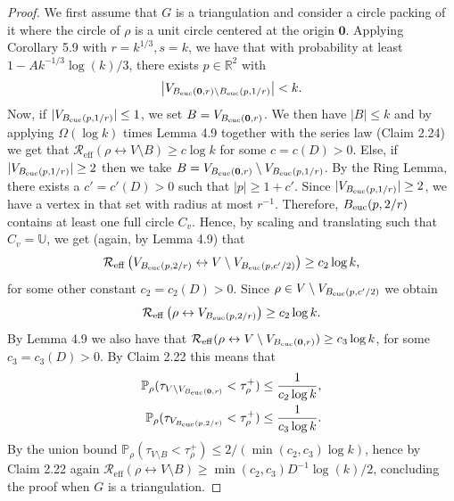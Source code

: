 \documentclass[UTF8,11pt]{ctexart}
\theoremstyle{definition}
\newcommand{\R}{\mathbb R}
\newcommand{\Prob}{\mathbb P}
\newcommand{\Reff}{\mathcal R_{\mathrm{eff}}}
\begin{document}
\begin{proof}
We first assume that $G$ is a triangulation and consider a circle packing of it where the circle of $\rho$ is a unit circle centered at the origin $\mathbf0$. Applying Corollary 5.9 with $r=k^{1/3},s=k$, we have that with probability at least $1-Ak^{-1/3}\log(k)/3$, there exists $p\in\R^2$ with
\[
\left|V_{B_{\rm euc}(\mathbf0,r)\setminus B_{\rm euc}(p,1/r)}\right|<k.
\]
Now, if $|V_{B_{\rm euc}(p,1/r)}|\le1$, we set $B=V_{B_{\rm euc}(\mathbf0,r)}$. We then have $|B|\le k$ and by applying $\Omega(\log k)$ times Lemma 4.9 together with the series law (Claim 2.24) we get that $\Reff(\rho\leftrightarrow V\setminus B)\ge c\log k$ for some $c=c(D)>0$.
Else, if $|V_{B_{\rm euc}(p,1/r)}|\ge2$ then we take $B=V_{B_{\rm euc}(\mathbf0,r)}\setminus V_{B_{\rm euc}(p,1/r)}$. By the Ring Lemma, there exists a $c'=c'(D)>0$ such that $|p|\ge1+c'$. Since $|V_{B_{\rm euc}(p,1/r)}|\ge2$, we have a vertex in that set with radius at most $r^{-1}$. Therefore, $B_{\rm euc}(p,2/r)$ contains at least one full circle $C_v$. Hence, by scaling and translating such that $C_v=\mathbb U$, we get (again, by Lemma 4.9) that
\[
\Reff\left(V_{B_{\rm euc}(p,2/r)}\leftrightarrow V\setminus V_{B_{\rm euc}(p,c'/2)}\right)\ge c_2\log k,
\]
for some other constant $c_2=c_2(D)>0$. Since $\rho\in V\setminus V_{B_{\rm euc}(p,c'/2)}$ we obtain
\[
\Reff\left(\rho\leftrightarrow V_{B_{\rm euc}(p,2/r)}\right)\ge c_2\log k.
\]
By Lemma 4.9 we also have that $\Reff(\rho\leftrightarrow V\setminus V_{B_{\rm euc}(\mathbf0,r)})\ge c_3\log k$, for some $c_3=c_3(D)>0$. By Claim 2.22 this means that
\begin{align*}
\Prob_\rho(\tau_{V\setminus V_{B_{\rm euc}(\mathbf0,r)}}<\tau_\rho^+)&\le\frac1{c_2\log k},\\
\Prob_\rho(\tau_{V_{B_{\rm euc}(p,2/r)}}<\tau_\rho^+)&\le\frac1{c_3\log k}.
\end{align*}
By the union bound $\Prob_\rho(\tau_{V\setminus B}<\tau_\rho^+)\le2/(\min(c_2,c_3)\log k)$, hence by Claim 2.22 again
$\Reff(\rho\leftrightarrow V\setminus B)\ge\min(c_2,c_3)D^{-1}\log(k)/2$,
concluding the proof when $G$ is a triangulation.


\end{proof}
\end{document}
